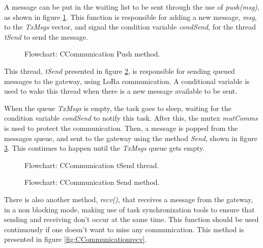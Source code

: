 A message can be put in the waiting list to be sent through the use of \textit{push(msg)}, as shown in figure \ref{fig:CCommunicationPush}. This function is responsible for adding a new message, \textit{msg}, to the \textit{TxMsgs} vector, and signal the condition variable \textit{condSend}, for the thread \textit{tSend} to send the message.

\begin{figure}[H]
	\centering
	\caption{Flowchart: CCommunication Push method.}
	\label{fig:CCommunicationPush}
\end{figure}

This thread, \textit{tSend} presented in figure \ref{fig:CCommunicationtsend}, is responsible for sending queued messages to the gateway, using LoRa communication. A conditional variable is used to wake this thread when there is a new message available to be sent.

When the queue \textit{TxMsgs} is empty, the task goes to sleep, waiting for the condition variable \textit{condSend} to notify this task. After this, the mutex \textit{mutComms} is used to protect the communication. Then, a message is popped from the messages queue, and sent to the gateway using the method \textit{Send}, shown in figure \ref{fig:CCommunicationsend}. This continues to happen until the \textit{TxMsgs} queue gets empty.

\begin{figure}[H]
	\centering
	\caption{Flowchart: CCommunication tSend thread.}
	\label{fig:CCommunicationtsend}
\end{figure}

\begin{figure}[H]
	\centering
	\caption{Flowchart: CCommunication Send method.}
	\label{fig:CCommunicationsend}
\end{figure}

There is also another method, \textit{recv()}, that receives a message from the gateway, in a non blocking mode, making use of task synchronization tools to ensure that sending and receiving don't occur at the same time. This function should be used continuously if one doesn't want to miss any communication. This method is presented in figure \ref{fig:CCommunicationrecv}.

